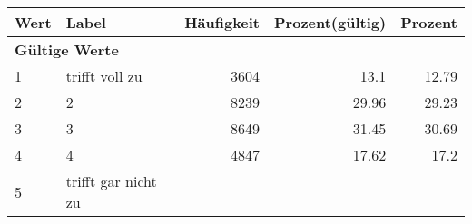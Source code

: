      \begin{longtable}{lXrrr}
     \toprule
     \textbf{Wert} & \textbf{Label} & \textbf{Häufigkeit} & \textbf{Prozent(gültig)} & \textbf{Prozent} \\
     \endhead
     \midrule
     \multicolumn{5}{l}{\textbf{Gültige Werte}}\\

     1 &
     \multicolumn{1}{X}{ trifft voll zu   } &


       \num{3604} &
       \num[round-mode=places,round-precision=2]{13,1} &
         \num[round-mode=places,round-precision=2]{12,79} \\

     2 &
     \multicolumn{1}{X}{ 2   } &


       \num{8239} &
       \num[round-mode=places,round-precision=2]{29,96} &
         \num[round-mode=places,round-precision=2]{29,23} \\

     3 &
     \multicolumn{1}{X}{ 3   } &


       \num{8649} &
       \num[round-mode=places,round-precision=2]{31,45} &
         \num[round-mode=places,round-precision=2]{30,69} \\

     4 &
     \multicolumn{1}{X}{ 4   } &


       \num{4847} &
       \num[round-mode=places,round-precision=2]{17,62} &
         \num[round-mode=places,round-precision=2]{17,2} \\

     5 &
     \multicolumn{1}{X}{ trifft gar nicht zu   } &



\end{longtable}
